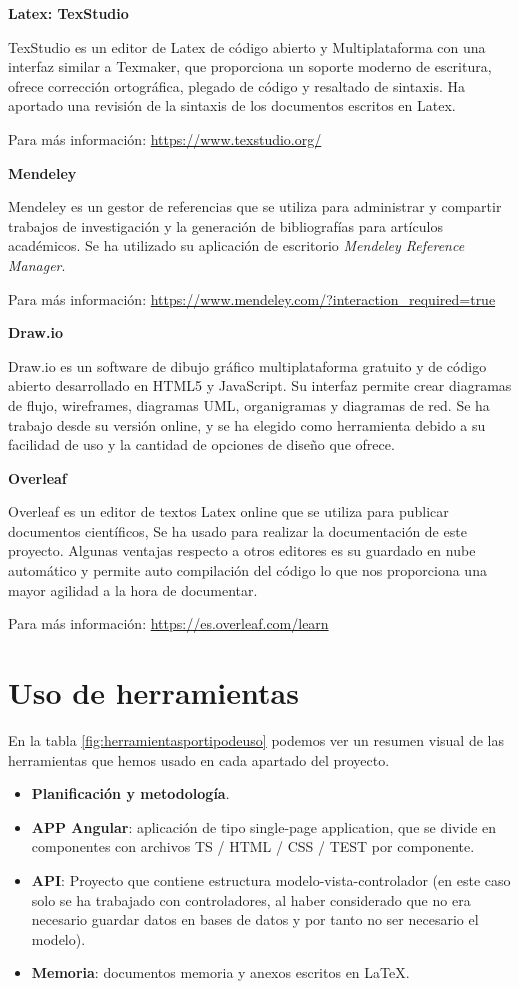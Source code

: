 \textbf{Latex: TexStudio}

TexStudio es un editor de Latex de código abierto y Multiplataforma con una interfaz similar a Texmaker, que proporciona un soporte moderno de escritura, ofrece corrección ortográfica, plegado de código y resaltado de sintaxis. Ha aportado una revisión de la sintaxis de los documentos escritos en Latex.

Para más información: \url{https://www.texstudio.org/}


\textbf{Mendeley}

Mendeley es un gestor de referencias que se utiliza para administrar y compartir trabajos de investigación y la generación de bibliografías para artículos académicos. Se ha utilizado su aplicación de escritorio  \textit{Mendeley Reference Manager}.

Para más información: \url{https://www.mendeley.com/?interaction_required=true}


\textbf{Draw.io}

Draw.io es un software de dibujo gráfico  multiplataforma  gratuito y de código abierto desarrollado en HTML5 y JavaScript. Su interfaz permite crear diagramas de flujo, wireframes, diagramas UML, organigramas y diagramas de red. Se ha trabajo desde su versión online, y se ha elegido como  herramienta debido a su facilidad de uso y la cantidad de opciones de diseño que ofrece.

\textbf{Overleaf}

Overleaf es un  editor de textos Latex online que se utiliza para publicar documentos científicos, Se ha usado para realizar la documentación de este proyecto. Algunas ventajas respecto a otros editores es su  guardado en nube automático y permite auto compilación del código lo que nos proporciona una mayor agilidad a la hora de documentar.

Para más información: \url{https://es.overleaf.com/learn}

\section{Uso de herramientas}

En la tabla \ref{fig:herramientasportipodeuso} podemos ver un resumen visual de las herramientas que hemos usado en cada apartado del proyecto.

\begin{itemize}
	\item \textbf{Planificación y metodología}.
	\item \textbf{APP Angular}: aplicación de tipo single-page application, que se divide en componentes con archivos TS / HTML / CSS / TEST por componente.
	\item \textbf{API}: Proyecto que contiene estructura modelo-vista-controlador (en este caso solo se ha  trabajado con controladores, al haber considerado que no era necesario guardar datos en bases de datos y por tanto no ser necesario el modelo).
	\item \textbf{Memoria}: documentos memoria y anexos escritos en \LaTeX{}.
\end{itemize}

